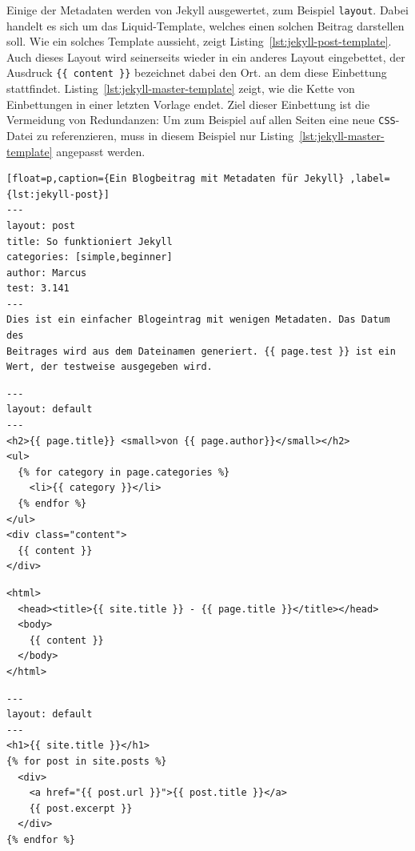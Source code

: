 Einige der Metadaten werden von Jekyll ausgewertet, zum Beispiel \texttt{layout}. Dabei handelt es sich um das Liquid-Template, welches einen solchen Beitrag darstellen soll. Wie ein solches Template aussieht, zeigt Listing~\ref{lst:jekyll-post-template}. Auch dieses Layout wird seinerseits wieder in ein anderes Layout eingebettet, der Ausdruck \texttt{\{\{ content \}\}} bezeichnet dabei den Ort. an dem diese Einbettung stattfindet. Listing~\ref{lst:jekyll-master-template} zeigt, wie die Kette von Einbettungen in einer letzten Vorlage endet. Ziel dieser Einbettung ist die Vermeidung von Redundanzen: Um zum Beispiel auf allen Seiten eine neue \texttt{CSS}-Datei zu referenzieren, muss in diesem Beispiel nur Listing~\ref{lst:jekyll-master-template} angepasst werden.

\begin{lstlisting}[float=p,caption={Ein Blogbeitrag mit Metadaten für Jekyll} ,label={lst:jekyll-post}]
---
layout: post
title: So funktioniert Jekyll
categories: [simple,beginner]
author: Marcus
test: 3.141
---
Dies ist ein einfacher Blogeintrag mit wenigen Metadaten. Das Datum des
Beitrages wird aus dem Dateinamen generiert. {{ page.test }} ist ein
Wert, der testweise ausgegeben wird.
\end{lstlisting}

\begin{lstlisting}[float=p,caption={Beispieltemplate für Blogbeiträge für Jekyll}, label={lst:jekyll-post-template}]
---
layout: default
---
<h2>{{ page.title}} <small>von {{ page.author}}</small></h2>
<ul>
  {% for category in page.categories %}
    <li>{{ category }}</li>
  {% endfor %}
</ul>
<div class="content">
  {{ content }}
</div>
\end{lstlisting}

\begin{lstlisting}[float=p,caption={Template mit HTML-Rumpf für Jekyll}, label={lst:jekyll-master-template}]
<html>
  <head><title>{{ site.title }} - {{ page.title }}</title></head>
  <body>
    {{ content }}
  </body>
</html>
\end{lstlisting}

\begin{lstlisting}[float=p,caption={Hauptseite mit Auszügen aller Beiträge für Jekyll}, label={lst:jekyll-main-page}]
---
layout: default
---
<h1>{{ site.title }}</h1>
{% for post in site.posts %}
  <div>
    <a href="{{ post.url }}">{{ post.title }}</a>
    {{ post.excerpt }}
  </div>
{% endfor %}
\end{lstlisting}

